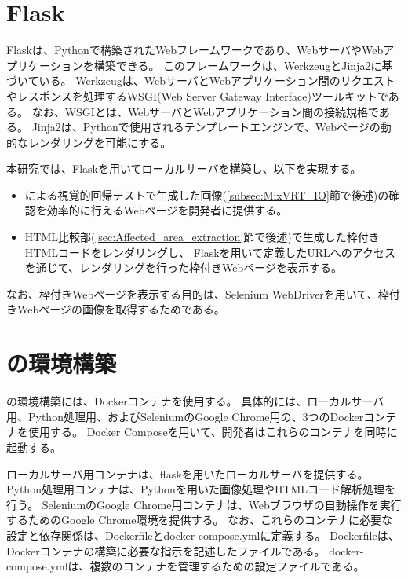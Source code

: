 
\section{Flask}\label{sec:Flask}
Flask\cite{Flask}は、Pythonで構築されたWebフレームワークであり、WebサーバやWebアプリケーションを構築できる。
このフレームワークは、Werkzeug\cite{Werkzeug}とJinja2\cite{Jinja}に基づいている。
Werkzeugは、WebサーバとWebアプリケーション間のリクエストやレスポンスを処理するWSGI(Web Server Gateway Interface)ツールキットである。
なお、WSGI\cite{WSGI}とは、WebサーバとWebアプリケーション間の接続規格である。
Jinja2は、Pythonで使用されるテンプレートエンジン\cite{TemplateEngine}で、Webページの動的なレンダリングを可能にする。
\par
本研究では、Flaskを用いてローカルサーバを構築し、以下を実現する。
\begin{itemize}
      \setlength{\itemsep}{0pt}
            \setlength{\parsep}{0pt}
      \item \toolName による視覚的回帰テストで生成した画像(\ref{subsec:MixVRT_IO}節で後述)の確認を効率的に行えるWebページを開発者に提供する。
      \item HTML比較部(\ref{sec:Affected_area_extraction}節で後述)で生成した枠付きHTMLコードをレンダリングし、
            Flaskを用いて定義したURLへのアクセスを通じて、レンダリングを行った枠付きWebページを表示する。
\end{itemize}
なお、枠付きWebページを表示する目的は、Selenium WebDriverを用いて、枠付きWebページの画像を取得するためである。

\section{\toolName の環境構築}\label{sec:MixVRT_env_gen}
\toolName の環境構築には、Dockerコンテナ\cite{DockerContainer}を使用する。
具体的には、ローカルサーバ用、Python処理用、およびSeleniumのGoogle Chrome用の、3つのDockerコンテナ\cite{DockerContainer}を使用する。
Docker Compose\cite{DockerCompose}を用いて、開発者はこれらのコンテナを同時に起動する。
\par
ローカルサーバ用コンテナは、flaskを用いたローカルサーバを提供する。
Python処理用コンテナは、Pythonを用いた画像処理やHTMLコード解析処理を行う。
SeleniumのGoogle Chrome用コンテナは、Webブラウザの自動操作を実行するためのGoogle Chrome環境を提供する。
なお、これらのコンテナに必要な設定と依存関係は、Dockerfileとdocker-compose.ymlに定義する。
Dockerfileは、Dockerコンテナの構築に必要な指示を記述したファイルである。
docker-compose.ymlは、複数のコンテナを管理するための設定ファイルである。

